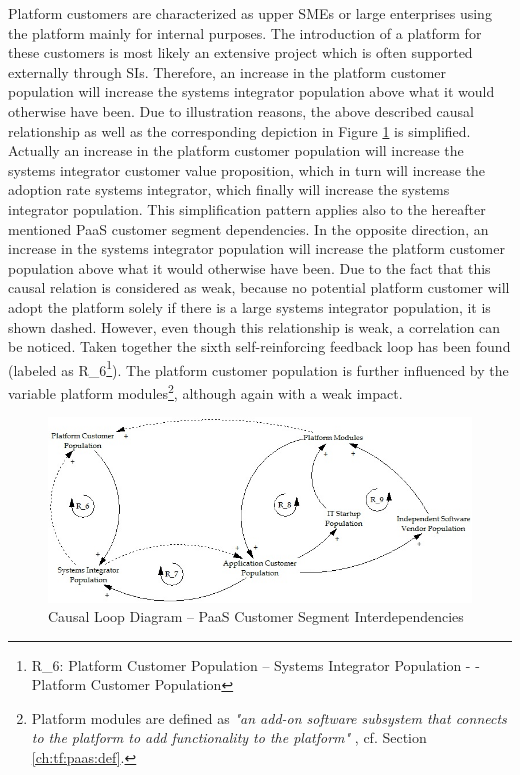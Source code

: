 Platform customers are characterized as upper \acp{SME} or large enterprises using the platform mainly for internal purposes. The introduction of a platform for these customers is most likely an extensive project which is often supported externally through \acp{SI}. Therefore, an increase in the platform customer population will increase the systems integrator population above what it would otherwise have been. Due to illustration reasons, the above described causal relationship as well as the corresponding depiction in Figure \ref{fig:cld_csi} is simplified. Actually an increase in the platform customer population will increase the systems integrator customer value proposition, which in turn will increase the adoption rate systems integrator, which finally will increase the systems integrator population. This simplification pattern applies also to the hereafter mentioned \ac{PaaS} customer segment dependencies. In the opposite direction, an increase in the systems integrator population will increase the platform customer population above what it would otherwise have been. Due to the fact that this causal relation is considered as weak, because no potential platform customer will adopt the platform solely if there is a large systems integrator population, it is shown dashed. However, even though this relationship is weak, a correlation can be noticed. Taken together the sixth self-reinforcing feedback loop has been found (labeled as R\_6\footnote{R\_6: Platform Customer Population -- Systems Integrator Population - - Platform Customer Population}). The platform customer population is further influenced by the variable platform modules\footnote{Platform modules are defined as \textit{"an add-on software subsystem that connects to the platform to add functionality to the platform"} \citep[p. 676]{Tiwana2010}, cf. Section \ref{ch:tf:paas:def}.}, although again with a weak impact.

\begin{figure}[tb]
	\centering
	\includegraphics[width=\textwidth]{gfx/cld_customerSegmentInterdependencies}
	\caption{Causal Loop Diagram -- PaaS Customer Segment Interdependencies}
	\label{fig:cld_csi}
\end{figure}

